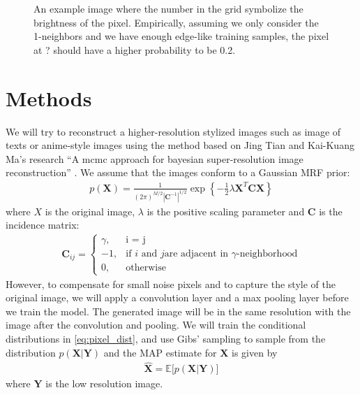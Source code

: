 \documentclass[conference]{IEEEtran}
\begin{document}
\begin{figure}[h]
\centering
{}
\caption{An example image where the number in the grid symbolize the brightness of the pixel. Empirically, assuming we only consider the 1-neighbors and we have enough edge-like training samples, the pixel at ? should have a higher probability to be 0.2.}
\label{img:mrf_eg}
\end{figure}

\section{Methods}
We will try to reconstruct a higher-resolution stylized images such as image of texts or anime-style images using the method based on Jing Tian and Kai-Kuang Ma's research ``A mcmc approach for bayesian super-resolution image reconstruction'' \cite{tian2005mcmc}. We assume that the images conform to a Gaussian MRF prior:
\begin{align}
    p(\mathbf{X}) 
    = \frac{1}{(2\pi)^{M/2} |\mathbf{C}^{-1}|^{1/2}} 
        \exp\left\{-\frac 1 2 \lambda \mathbf{X}^{T}\mathbf{CX}\right\}
    \label{eq:gmrf}
\end{align}
where $X$ is the original image, $\lambda$ is the positive scaling parameter and $\mathbf C$ is the incidence matrix:
\begin{align}
    \mathbf{C}_{ij} = \begin{cases}
        \gamma, &\text{i = j} \\
        -1, &\text{if }i\text{ and }j\text{are adjacent in }\gamma\text{-neighborhood} \\
        0, &\text{otherwise} 
    \end{cases}
    \label{eq:c_mat}
\end{align}
However, to compensate for small noise pixels and to capture the style of the original image, we will apply a convolution layer and a max pooling layer before we train the model. The generated image will be in the same resolution with the image after the convolution and pooling. We will train the conditional distributions in \eqref{eq:pixel_dist}, and use Gibs' sampling to sample from the distribution $p(\mathbf{X}|\mathbf{Y})$ and the MAP estimate for $\mathbf{X}$ is given by
\begin{align}
    \hat{\mathbf{X}} = \mathbb{E}\big[p(\mathbf{X}|\mathbf{Y})\big]
    \label{eq:map_est}
\end{align}
where $\mathbf{Y}$ is the low resolution image.



\end{document}
